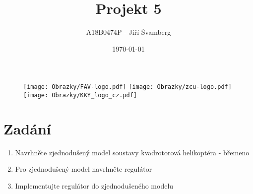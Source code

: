 \documentclass[a4paper, 12pt]{article}
\author{A18B0474P - Jiří Švamberg}
\title{Projekt 5}
\date{\today}
\begin{document}
	\begin{titlepage}
		\maketitle
		\begin{figure}
			\centering
			\texttt{[image: Obrazky/FAV-logo.pdf]}
			\texttt{[image: Obrazky/zcu-logo.pdf]}
			\texttt{[image: Obrazky/KKY\_logo\_cz.pdf]}
		\end{figure}
		\thispagestyle{empty}
		\newpage
	\end{titlepage}

	\tableofcontents
	\newpage
	\section{Zadání}
		\begin{enumerate}
			\item Navrhněte zjednodušený model soustavy kvadrotorová helikoptéra - břemeno\\
			\item Pro zjednodušený model navrhněte regulátor\\
			\item Implementujte regulátor do zjednodušeného modelu\\
		\end{enumerate}
		\clearpage
\end{document}
